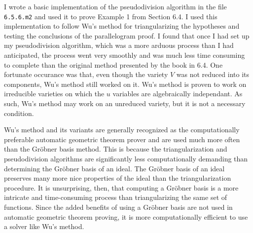 \documentclass{article}
\theoremstyle{plain}
\theoremstyle{definition}
\theoremstyle{remark}
\newcommand{\gro}{Gr\"obner }
\begin{document}
I wrote a basic implementation of the pseudodivision algorithm in the file \texttt{6.5.6.m2} and used it to prove Example 1 from Section 6.4. 
I used this implementation to follow Wu's method for triangularizing the hypotheses and testing the conclusions of the parallelogram proof.
I found that once I had set up my pseudodivision algorithm, which was a more arduous process than I had anticipated, 
the process went very smoothly and was much less time consuming to complete than the original method presented by the book in 6.4.
One fortunate occurance was that, even though the variety $V$ was not reduced into its components, Wu's method still worked on it.
Wu's method is proven to work on irreducible varieties on which the $u$ variables are algebraically independant.
As such, Wu's method may work on an unreduced variety, but it is not a necessary condition.

Wu's method and its variants are generally recognized as the computationally preferable automatic geometric theorem prover and are used much more often than the Gröbner basis method.
This is because the triangularization and pseudodivision algorithms are significantly less computationally demanding than determining the Gröbner basis of an ideal.
The \gro basis of an ideal preserves many more nice properties of the ideal than the triangularization procedure. 
It is unsurprising, then, that computing a \gro basis is a more intricate and time-consuming process than triangularizing the same set of functions.
Since the added benefits of using a \gro basis are not used in automatic geometric theorem proving, it is more computationally efficient to use a solver like Wu's method.
\end{document}
